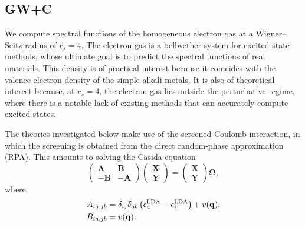 \documentclass[%
 reprint,
 amsmath,amssymb,
 aps,
]{revtex4-2}
\begin{document}
\subsection{GW+C}
We compute spectral functions of the homogeneous electron gas at a Wigner--Seitz radius of $r_s = 4$. The electron gas is a bellwether system for excited-state methods, whose ultimate goal is to predict the spectral functions of real materials. This density is of practical interest because it coincides with the valence electron density of the simple alkali metals. It is also of theoretical interest because, at $r_s = 4$, the electron gas lies outside the perturbative regime, where there is a notable lack of existing  methods that can accurately compute excited states.

The theories investigated below make use of the screened Coulomb interaction, in which the screening is obtained from the direct random-phase approximation (RPA). This amounts to solving the Casida equation
\begin{equation}
\begin{pmatrix}
\mathbf{A} & \mathbf{B} \\
-\mathbf{B} & -\mathbf{A}
\end{pmatrix}
\begin{pmatrix}
\mathbf{X} \\
\mathbf{Y}
\end{pmatrix}
=
\begin{pmatrix}
\mathbf{X} \\
\mathbf{Y}
\end{pmatrix}
\mathbf{\Omega},
\label{eq:casida}
\end{equation}
where
\begin{align}
    A_{ia,jb} &= \delta_{ij}\delta_{ab} \left(\epsilon_a^{\rm LDA}-\epsilon_i^{\rm LDA}\right) + v(\mathbf{q}),\\
    B_{ia,jb} &= v(\mathbf{q}).
\end{align}
\end{document}
